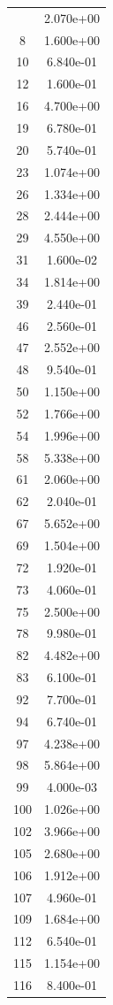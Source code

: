 \documentclass[12pt]{article}
\begin{document}
\begin{longtable}{@{}cc@{}}
\bottomrule
\endlastfoot
5 & 2.070e+00 \\
8 & 1.600e+00 \\
10 & 6.840e-01 \\
12 & 1.600e-01 \\
16 & 4.700e+00 \\
19 & 6.780e-01 \\
20 & 5.740e-01 \\
23 & 1.074e+00 \\
26 & 1.334e+00 \\
28 & 2.444e+00 \\
29 & 4.550e+00 \\
31 & 1.600e-02 \\
34 & 1.814e+00 \\
39 & 2.440e-01 \\
46 & 2.560e-01 \\
47 & 2.552e+00 \\
48 & 9.540e-01 \\
50 & 1.150e+00 \\
52 & 1.766e+00 \\
54 & 1.996e+00 \\
58 & 5.338e+00 \\
61 & 2.060e+00 \\
62 & 2.040e-01 \\
67 & 5.652e+00 \\
69 & 1.504e+00 \\
72 & 1.920e-01 \\
73 & 4.060e-01 \\
75 & 2.500e+00 \\
78 & 9.980e-01 \\
82 & 4.482e+00 \\
83 & 6.100e-01 \\
92 & 7.700e-01 \\
94 & 6.740e-01 \\
97 & 4.238e+00 \\
98 & 5.864e+00 \\
99 & 4.000e-03 \\
100 & 1.026e+00 \\
102 & 3.966e+00 \\
105 & 2.680e+00 \\
106 & 1.912e+00 \\
107 & 4.960e-01 \\
109 & 1.684e+00 \\
112 & 6.540e-01 \\
115 & 1.154e+00 \\
116 & 8.400e-01 \\

\end{longtable}
\end{document}
